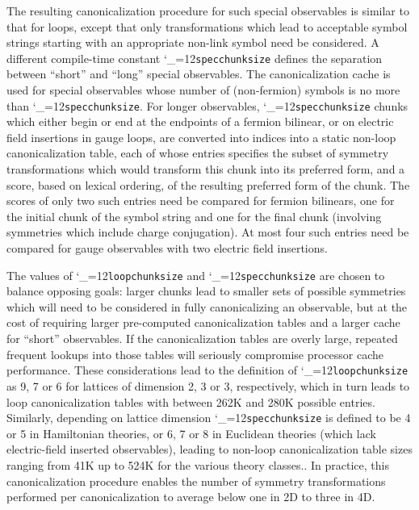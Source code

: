 \documentclass [12pt]{article}
\makeatletter
\renewcommand{\tt}{\begingroup\catcode`_=12\def\_{\string_}\tt@}
\newcommand{\tt@}[1]{\texttt{#1}\endgroup}
\makeatother
\begin{document}
The resulting canonicalization procedure for such special observables
is similar to that for loops, except that only transformations which
lead to acceptable symbol strings starting with an appropriate non-link
symbol need be considered.
A different compile-time constant \tt{specchunksize} defines
the separation between ``short'' and ``long'' special observables.
The canonicalization cache is used for special observables whose
number of (non-fermion) symbols is no more than \tt{specchunksize}.
For longer observables, \tt{specchunksize} chunks
which either begin or end at the endpoints of a fermion bilinear,
or on electric field insertions in gauge loops,
are converted into indices into a static non-loop canonicalization
table, each of whose entries specifies the subset of
symmetry transformations which would transform
this chunk into its preferred form, and a score,
based on lexical ordering, of the resulting preferred form of the chunk.
The scores of only two such entries need be compared
for fermion bilinears, one for the initial chunk of the symbol string
and one for the final chunk (involving symmetries which
include charge conjugation).
At most four such entries need be compared for
gauge observables with two electric field insertions.

The values of \tt{loopchunksize} and \tt{specchunksize}
are chosen to balance opposing goals:
larger chunks lead to smaller sets of possible symmetries which
will need to be considered in fully canonicalizing an observable,
but at the cost of requiring larger pre-computed canonicalization
tables and a larger cache for ``short'' observables.
If the canonicalization tables are overly large, repeated frequent
lookups into those tables will seriously compromise processor cache
performance.
These considerations lead to the definition of
\tt{loopchunksize} as 9, 7 or 6 for lattices
of dimension 2, 3 or 3, respectively, which in turn
leads to loop canonicalization tables
with between 262K and 280K possible entries.
Similarly, depending on lattice dimension \tt{specchunksize}
is defined to be 4 or 5 in Hamiltonian theories, or 6, 7 or 8
in Euclidean theories (which lack electric-field inserted
observables),
leading to  non-loop canonicalization table sizes ranging from
41K up to 524K for the various theory classes..
In practice, this canonicalization procedure enables the
number of symmetry transformations performed per canonicalization
to average below one in 2D to three in 4D.

\advance\abovedisplayskip -2pt
\advance\belowdisplayskip -2pt
\advance\abovedisplayshortskip -2pt
\advance\belowdisplayshortskip -2pt
\end{document}
